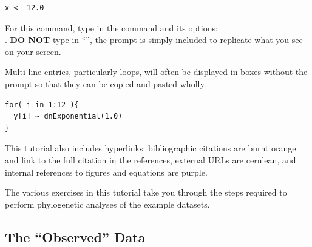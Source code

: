 {\tt \begin{snugshade*}
\begin{lstlisting}
x <- 12.0
\end{lstlisting}
\end{snugshade*}}

For this command, type in the command and its options:\\ . \textbf{DO NOT} type in ``'', the prompt is simply included to replicate what you see on your screen. 

Multi-line entries, particularly loops, will often be displayed in boxes without the  prompt so that they can be copied and pasted wholly. 
{\tt \begin{snugshade*}
\begin{lstlisting}
for( i in 1:12 ){
  y[i] ~ dnExponential(1.0)
}
\end{lstlisting}
\end{snugshade*}}


%


This tutorial also includes hyperlinks: bibliographic citations are {\textcolor{citescol}{burnt orange}} and link to the full citation in the references, external URLs are {\textcolor{urlscol}{cerulean}}, and internal references to figures and equations are {\textcolor{linkscol}{purple}}.

The various exercises in this tutorial take you through the steps required to perform phylogenetic analyses of the example datasets. 


\subsection{The ``Observed'' Data}

